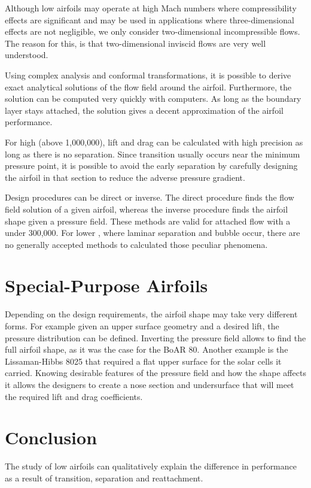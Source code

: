 \documentclass[letterpaper,12pt,]{article}
\begin{document}
Although low \rn airfoils may operate at high Mach numbers where compressibility effects are significant and may be used in applications where three-dimensional effects are not negligible, we only consider two-dimensional incompressible flows. The reason for this, is that two-dimensional inviscid flows are very well understood.

Using complex analysis and conformal transformations, it is possible to derive exact analytical solutions of the flow field around the airfoil. Furthermore, the solution can be computed very quickly with computers. As long as the boundary layer stays attached, the solution gives a decent approximation of the airfoil performance. 

For high \rn (above 1,000,000), lift and drag can be calculated with high precision as long as there is no separation. Since transition usually occurs near the minimum pressure point, it is possible to avoid the early separation by carefully designing the airfoil in that section to reduce the adverse pressure gradient.

Design procedures can be direct or inverse. The direct procedure finds the flow field solution of a given airfoil, whereas the inverse procedure finds the airfoil shape given a pressure field. These methods are valid for attached flow with a \rn under 300,000. For lower \rn, where laminar separation and bubble occur, there are no generally accepted methods to calculated those peculiar phenomena.

\section{Special-Purpose Airfoils}

Depending on the design requirements, the airfoil shape may take very different forms. For example given an upper surface geometry and a desired lift, the pressure distribution can be defined. Inverting the pressure field allows to find the full airfoil shape, as it was the case for the BoAR 80. Another example is the Lissaman-Hibbs 8025 that required a flat upper surface for the solar cells it carried. Knowing desirable features of the pressure field and how the shape affects it allows the designers to create a nose section and undersurface that will meet the required lift and drag coefficients.

\section{Conclusion}

The study of low \rn airfoils can qualitatively explain the difference in performance as a result of transition, separation and reattachment. 

%
%
\end{document}
